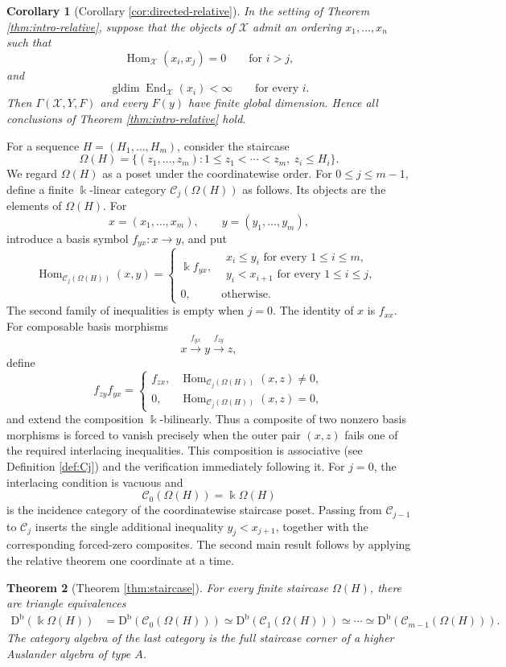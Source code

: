 \documentclass[12pt,a4paper,english,reqno]{amsart}
\theoremstyle{plain}
\newtheorem{theorem}{Theorem}[section]
\newtheorem{corollary}[theorem]{Corollary}
\theoremstyle{definition}
\newcommand{\kk}{\Bbbk}
\newcommand{\Db}{\mathrm D^{\mathrm b}}
\newcommand{\Hom}{\operatorname{Hom}}
\newcommand{\End}{\operatorname{End}}
\newcommand{\gldim}{\operatorname{gldim}}
\newcommand{\C}{\mathcal C}
\newcommand{\X}{\mathcal X}
\newcommand{\G}{\Gamma}
\begin{document}
\begin{corollary}[Corollary \ref{cor:directed-relative}]
\label{cor:intro-directed-relative}
In the setting of Theorem \ref{thm:intro-relative}, suppose that the objects of
$\X$ admit an ordering $x_1,\ldots,x_n$ such that
\[
 \Hom_{\X}(x_i,x_j)=0\qquad\text{for }i>j,
\]
and
\[
 \gldim\End_{\X}(x_i)<\infty\qquad\text{for every }i.
\]
Then $\G(\X,Y,F)$ and every $F(y)$ have finite global dimension.
Hence all conclusions of Theorem \ref{thm:intro-relative} hold.
\end{corollary}


For a sequence $H=(H_1,\ldots,H_m)$, consider the staircase
\[
 \Omega(H)=
 \{(z_1,\ldots,z_m):1\leq z_1<\cdots<z_m,\ z_i\leq H_i\}.
\]
We regard $\Omega(H)$ as a poset under the coordinatewise order.  For
$0\leq j\leq m-1$, define a finite $\kk$-linear category
$\C_j(\Omega(H))$ as follows.  Its objects are the elements of
$\Omega(H)$.  For
\[
 x=(x_1,\ldots,x_m),\qquad y=(y_1,\ldots,y_m),
\]
introduce a basis symbol $f_{yx}:x\to y$, and put
\[
 \Hom_{\C_j(\Omega(H))}(x,y)=
 \begin{cases}
  \kk f_{yx},&
  \substack{x_i\leq y_i\text{ for every }1\leq i\leq m,\\
  y_i<x_{i+1}\text{ for every }1\leq i\leq j,}\\
  0,&\text{otherwise}.
 \end{cases}
\]
The second family of inequalities is empty when $j=0$.  The identity of
$x$ is $f_{xx}$.  For composable basis morphisms
\[
 x\xrightarrow{f_{yx}}y\xrightarrow{f_{zy}}z,
\]
define
\[
 f_{zy}f_{yx}=
 \begin{cases}
  f_{zx},&\Hom_{\C_j(\Omega(H))}(x,z)\neq0,\\
  0,&\Hom_{\C_j(\Omega(H))}(x,z)=0,
 \end{cases}
\]
and extend the composition $\kk$-bilinearly.  Thus a composite of two
nonzero basis morphisms is forced to vanish precisely when the outer pair
$(x,z)$ fails one of the required interlacing inequalities.  This
composition is associative (see Definition \ref{def:Cj}) and the verification
immediately following it.  For $j=0$, the interlacing condition is vacuous and
\[
 \C_0(\Omega(H))=\kk\Omega(H)
\]
is the incidence category of the coordinatewise staircase poset.  Passing
from $\C_{j-1}$ to $\C_j$ inserts the single additional inequality
$y_j<x_{j+1}$, together with the corresponding forced-zero composites.
The second main result follows by applying the relative theorem one
coordinate at a time.

\begin{theorem}[Theorem \ref{thm:staircase}]
\label{thm:intro-staircase}
For every finite staircase $\Omega(H)$, there are triangle equivalences
\[
\begin{aligned}
 \Db(\kk\Omega(H))
 &=\Db(\C_0(\Omega(H)))
 \simeq\Db(\C_1(\Omega(H)))\simeq\cdots\simeq
 \Db(\C_{m-1}(\Omega(H))).
\end{aligned}
\]
The category algebra of the last category is the full staircase corner of a
higher Auslander algebra of type $A$.
\end{theorem}
\end{document}
